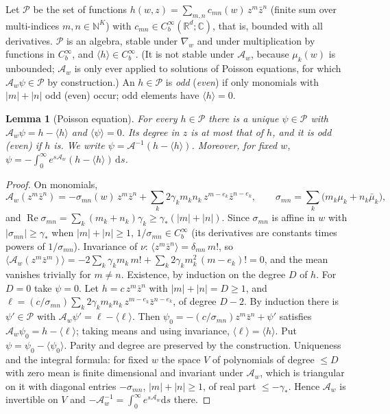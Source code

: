 \documentclass[11pt]{article}
\newcommand{\dd}{\mathrm{d}}
\newcommand{\cA}{\mathcal{A}}
\newcommand{\cP}{\mathcal{P}}
\renewcommand{\Re}{\operatorname{Re}}
\newcommand{\avg}[1]{\langle #1\rangle}
\newtheorem{lemma}[theorem]{Lemma}
\theoremstyle{remark}
\begin{document}
Let $\cP$ be the set of functions
$h(w,z) = \sum_{m,n}c_{mn}(w)\,z^m\bar z^n$ (finite sum over multi-indices
$m,n\in\mathbb{N}^K$) with $c_{mn}\in C_b^\infty(\mathbb{R}^d;\mathbb{C})$,
that is, bounded with all derivatives. $\cP$ is an algebra, stable under
$\nabla_w$ and under multiplication by functions in $C_b^\infty$, and
$\avg{h}\in C_b^\infty$. (It is not stable under $\cA_w$, because $\mu_k(w)$
is unbounded; $\cA_w$ is only ever applied to solutions of Poisson equations,
for which $\cA_w\psi\in\cP$ by construction.) An
$h\in\cP$ is \emph{odd} (\emph{even}) if only monomials with $|m|+|n|$ odd
(even) occur; odd elements have $\avg h = 0$.

\begin{lemma}[Poisson equation]\label{lem:poisson}
For every $h\in\cP$ there is a unique $\psi\in\cP$ with
$\cA_w\psi = h - \avg h$ and $\avg\psi = 0$. Its degree in $z$ is at most that
of $h$, and it is odd (even) if $h$ is. We write $\psi = \cA^{-1}(h-\avg h)$.
Moreover, for fixed $w$,
$\psi = -\int_0^\infty e^{s\cA_w}(h-\avg h)\,\dd s$.
\end{lemma}

\begin{proof}
On monomials,
\[
  \cA_w(z^m\bar z^n) = -\sigma_{mn}(w)\,z^m\bar z^n
   + \sum_k 2\gamma_km_kn_k\,z^{m-e_k}\bar z^{n-e_k},
  \qquad \sigma_{mn} = \sum_k\bigl(m_k\mu_k + n_k\bar\mu_k\bigr),
\]
and $\Re\sigma_{mn} = \sum_k(m_k+n_k)\gamma_k\ge\gamma_*(|m|+|n|)$. Since
$\sigma_{mn}$ is affine in $w$ with $|\sigma_{mn}|\ge\gamma_*$ when
$|m|+|n|\ge1$, $1/\sigma_{mn}\in C_b^\infty$ (its derivatives are constants
times powers of $1/\sigma_{mn}$).
Invariance of $\nu$: $\avg{z^m\bar z^n} = \delta_{mn}\,m!$, so
$\avg{\cA_w(z^m\bar z^m)} = -2\sum_k\gamma_km_k\,m!
 + \sum_k2\gamma_km_k^2\,(m-e_k)! = 0$, and the mean vanishes trivially for
$m\ne n$.
Existence, by induction on the degree $D$ of $h$. For $D=0$ take $\psi=0$.
Let $h = c\,z^m\bar z^n$ with $|m|+|n| = D\ge1$, and
$\ell = (c/\sigma_{mn})\sum_k2\gamma_km_kn_k\,z^{m-e_k}\bar z^{n-e_k}$, of
degree $D-2$. By induction there is $\psi'\in\cP$ with
$\cA_w\psi' = \ell - \avg\ell$. Then
$\psi_0 = -(c/\sigma_{mn})z^m\bar z^n + \psi'$ satisfies
$\cA_w\psi_0 = h - \avg\ell$; taking means and using invariance,
$\avg\ell = \avg h$. Put $\psi = \psi_0 - \avg{\psi_0}$. Parity and degree are
preserved by the construction.
Uniqueness and the integral formula: for fixed $w$ the space $V$ of
polynomials of degree $\le D$ with zero mean is finite dimensional and
invariant under $\cA_w$, which is triangular on it with diagonal entries
$-\sigma_{mn}$, $|m|+|n|\ge1$, of real part $\le-\gamma_*$. Hence $\cA_w$ is
invertible on $V$ and $-\cA_w^{-1} = \int_0^\infty e^{s\cA_w}\dd s$ there.
\end{proof}
\end{document}
